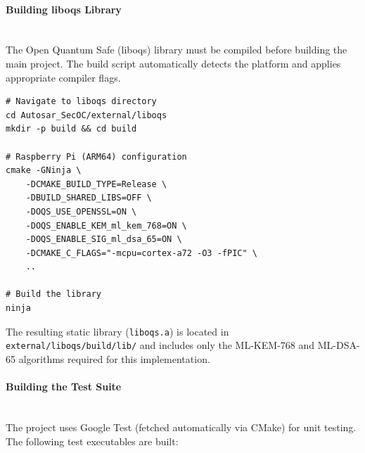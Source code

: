 \paragraph{Building liboqs Library}
\mbox{}\\
The Open Quantum Safe (liboqs) library must be compiled before building the main
project. The build script automatically detects the platform and applies
appropriate compiler flags.

\begin{verbatim}
# Navigate to liboqs directory
cd Autosar_SecOC/external/liboqs
mkdir -p build && cd build

# Raspberry Pi (ARM64) configuration
cmake -GNinja \
    -DCMAKE_BUILD_TYPE=Release \
    -DBUILD_SHARED_LIBS=OFF \
    -DOQS_USE_OPENSSL=ON \
    -DOQS_ENABLE_KEM_ml_kem_768=ON \
    -DOQS_ENABLE_SIG_ml_dsa_65=ON \
    -DCMAKE_C_FLAGS="-mcpu=cortex-a72 -O3 -fPIC" \
    ..

# Build the library
ninja
\end{verbatim}

The resulting static library (\texttt{liboqs.a}) is located in
\texttt{external/liboqs/build/lib/} and includes only the ML-KEM-768 and
ML-DSA-65 algorithms required for this implementation.

\paragraph{Building the Test Suite}
\mbox{}\\
The project uses Google Test (fetched automatically via CMake) for unit testing.
The following test executables are built:

